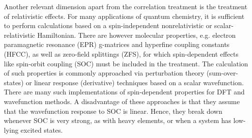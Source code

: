 Another relevant dimension apart from the correlation treatment is the treatment of relativistic effects. For many applications of quantum chemistry, it is sufficient to perform calculations based on a spin-independent nonrelativistic or scalar-relativistic Hamiltonian. There are however molecular properties, e.g. electron paramagnetic resonance (EPR) g-matrices and hyperfine coupling constants (HFCC), as well as zero-field splittings (ZFS), for which spin-dependent effects like spin-orbit coupling (SOC) must be included in the treatment.
The calculation of such properties is commonly approached via perturbation theory (sum-over-states) or linear response (derivative) techniques based on a scalar wavefunction.\cite{Neese_2017_1} There are many such implementations of spin-dependent properties for DFT\cite{SchreZ_1997_3388, LenthAW_1998_4783, MalkiVSMMK_2000_9206, Neese_2001_11080, Neese_2003_3939, Neese_2007_164112} and wavefunction methods.\cite{LushiG_1996_259, VahtrMAa_1997_186, BrownGTKM_2003_9552, Neese_2007_2507, GaussKN_2009_11541, SandhKN_2013_104102} A disadvantage of these approaches is that they assume that the wavefunction response to SOC is linear. Hence, they break down whenever SOC is very strong, as with heavy elements, or when a system has low-lying excited states.
